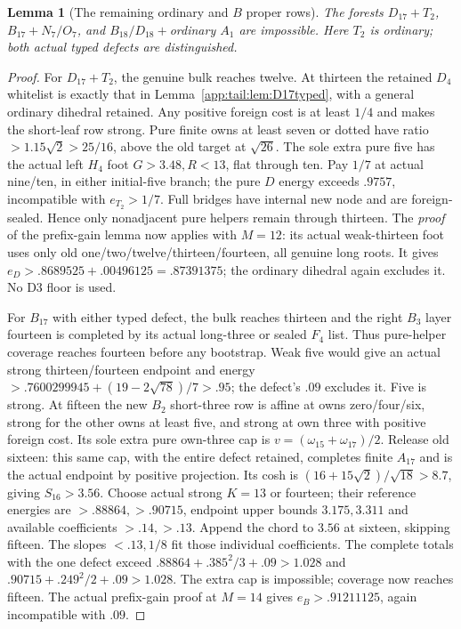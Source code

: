 \documentclass[11pt]{article}
\newtheorem{lemma}[theorem]{Lemma}
\theoremstyle{definition}
\theoremstyle{remark}
\begin{document}
\begin{lemma}[The remaining ordinary and $B$ proper rows]
\label{app:tail:lem:proper19standard}
The forests $D_{17}+T_2$, $B_{17}+N_7/O_7$, and
$B_{18}/D_{18}+$ordinary $A_1$ are impossible. Here $T_2$
is ordinary; both actual typed defects are distinguished.
\end{lemma}
\begin{proof}
For $D_{17}+T_2$, the genuine bulk reaches twelve.
At thirteen the retained $D_4$ whitelist is exactly that in
Lemma~\ref{app:tail:lem:D17typed}, with a general ordinary
dihedral retained. Any positive foreign cost is at least $1/4$
and makes the short-leaf row strong. Pure finite owns at least
seven or dotted have ratio $>1.15\sqrt2>25/16$, above the
old target at $\sqrt{26}$.
The sole extra pure five has the actual left $H_4$ foot
$G>3.48,R<13$, flat through ten.
Pay $1/7$ at actual nine/ten, in either initial-five branch;
the pure $D$ energy exceeds $.9757$, incompatible with
$e_{T_2}>1/7$. Full bridges have internal new node and are
foreign-sealed. Hence only nonadjacent pure helpers remain
through thirteen. The \emph{proof} of the prefix-gain lemma
now applies with $M=12$: its actual weak-thirteen foot uses
only old one/two/twelve/thirteen/fourteen, all genuine long
roots. It gives $e_D>.8689525+.00496125=.87391375$;
the ordinary dihedral again excludes it. No D3 floor is used.

For $B_{17}$ with either typed defect, the bulk reaches thirteen
and the right $B_3$ layer fourteen is completed by its actual
long-three or sealed $F_4$ list. Thus pure-helper coverage
reaches fourteen before any bootstrap.
Weak five would give an actual strong thirteen/fourteen
endpoint and energy
$>.7600299945+(19-2\sqrt{78})/7>.95$;
the defect's $.09$ excludes it. Five is strong.
At fifteen the new $B_2$ short-three row is affine at
owns zero/four/six, strong for the other owns at least five,
and strong at own three with positive foreign cost.
Its sole extra pure own-three cap is
$v=(\omega_{15}+\omega_{17})/2$.
Release old sixteen: this same cap, with the entire defect
retained, completes finite $A_{17}$ and is the actual endpoint
by positive projection. Its cosh is
$(16+15\sqrt2)/\sqrt{18}>8.7$, giving $S_{16}>3.56$.
Choose actual strong $K=13$ or fourteen; their reference
energies are $>.88864,>.90715$, endpoint upper bounds
$3.175,3.311$ and available coefficients $>.14,>.13$.
Append the chord to $3.56$ at sixteen, skipping fifteen.
The slopes $<.13,1/8$ fit those individual coefficients.
The complete totals with the one defect exceed
$ .88864+.385^2/3+.09>1.028$ and
$ .90715+.249^2/2+.09>1.028$.
The extra cap is impossible; coverage now reaches fifteen.
The actual prefix-gain proof at $M=14$ gives
$e_B>.91211125$, again incompatible with $.09$.


\end{proof}
\end{document}
